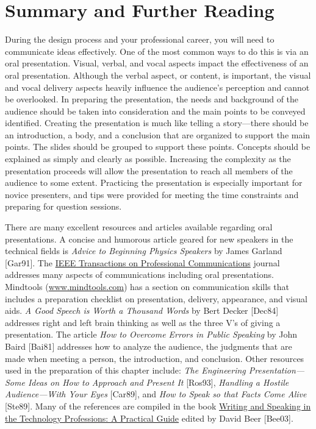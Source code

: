 \begin{table}
\begin{tabular}{|m{13cm}|m{2cm}|}
\end{tabular}
\end{table}


\section{Summary and Further Reading}
\label{section:summary-and-further-reading}

During the design process and your professional career, you will need to
communicate ideas effectively. One of the most common ways to do this is
via an oral presentation. Visual, verbal, and vocal aspects impact the
effectiveness of an oral presentation. Although the verbal aspect, or
content, is important, the visual and vocal delivery aspects heavily
influence the audience's perception and cannot be overlooked. In
preparing the presentation, the needs and background of the audience
should be taken into consideration and the main points to be conveyed
identified. Creating the presentation is much like telling a
story---there should be an introduction, a body, and a conclusion that
are organized to support the main points. The slides should be grouped
to support these points. Concepts should be explained as simply and
clearly as possible. Increasing the complexity as the presentation
proceeds will allow the presentation to reach all members of the
audience to some extent. Practicing the presentation is especially
important for novice presenters, and tips were provided for meeting the
time constraints and preparing for question sessions.

There are many excellent resources and articles available regarding oral
presentations. A concise and humorous article geared for new speakers in
the technical fields is \emph{Advice to Beginning Physics Speakers} by
James Garland {[}Gar91{]}. The \ul{IEEE Transactions on Professional
Communications} journal addresses many aspects of communications
including oral presentations. Mindtools
(\href{http://www.mindtools.com}{www.mindtools.com}) has a section on
communication skills that includes a preparation checklist on
presentation, delivery, appearance, and visual aids. \emph{A Good Speech
is Worth a Thousand Words} by Bert Decker {[}Dec84{]} addresses right
and left brain thinking as well as the three V's of giving a
presentation. The article \emph{How to Overcome Errors in Public
Speaking} by John Baird {[}Bai81{]} addresses how to analyze the
audience, the judgments that are made when meeting a person, the
introduction, and conclusion. Other resources used in the preparation of
this chapter include: \emph{The Engineering Presentation---Some Ideas on
How to Approach and Present It} {[}Ros93{]}, \emph{Handling a Hostile
Audience---With Your Eyes} {[}Car89{]}, and \emph{How to Speak so that
Facts Come Alive} {[}Ste89{]}. Many of the references are compiled in
the book \ul{Writing and Speaking in the Technology Professions: A
Practical Guide} edited by David Beer {[}Bee03{]}.
